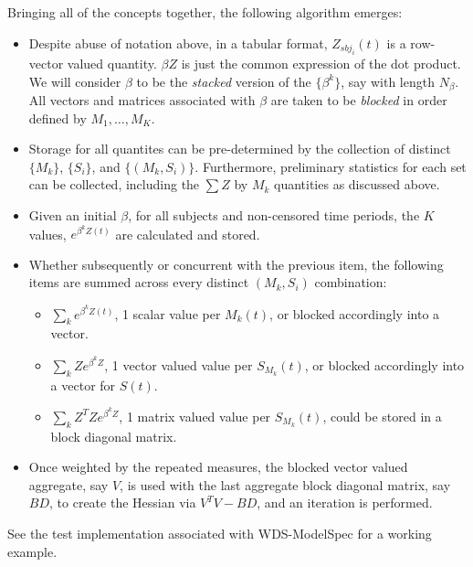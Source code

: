 \documentclass[10pt]{article}
\begin{document}
Bringing all of the concepts together, the following algorithm emerges:
\begin{itemize}
    \item Despite abuse of notation above, in a tabular format, $Z_{sbj_i}(t)$ is a row-vector valued quantity. $\beta Z$ is just the common
        expression of the dot product.  We will consider $\beta$ to be the {\em stacked} version of the $\{\beta^k\}$, say with length
        $N_{\beta}$.  All vectors and matrices associated with $\beta$ are taken to be {\em blocked} in order defined by $M_1, \ldots, M_K$.
    \item Storage for all quantites can be pre-determined by the collection of distinct $\{M_k\}$, $\{S_i\}$, and $\{(M_k, S_i)\}$.  
        Furthermore, preliminary statistics for each set can be collected, including the $\sum Z$ by $M_k$ quantities as discussed above.
    \item Given an initial $\beta$, for all subjects and non-censored time periods, the $K$ values, $e^{\beta^kZ(t)}$ are calculated and
        stored.
    \item Whether subsequently or concurrent with the previous item, the following items are summed across every distinct $(M_k, S_i)$ combination:
        \begin{itemize}
            \item $\sum_k e^{\beta^k Z(t)}$, 1 scalar value per $M_k(t)$, or blocked accordingly into a vector.
            \item $\sum_k Ze^{\beta^k Z}$, 1 vector valued value per $S_{M_k}(t)$, or blocked accordingly into a vector for $S(t)$.
            \item $\sum_k Z^TZe^{\beta^k Z}$, 1 matrix valued value per $S_{M_k}(t)$, could be stored in a block diagonal matrix.
        \end{itemize}
    \item Once weighted by the repeated measures, the blocked vector valued aggregate, say $V$, is used with the last aggregate block
        diagonal matrix, say $BD$, to create the Hessian via $V^TV-BD$, and an iteration is performed.
\end{itemize}

See the test implementation associated with WDS-ModelSpec for a working example.
\end{document}
